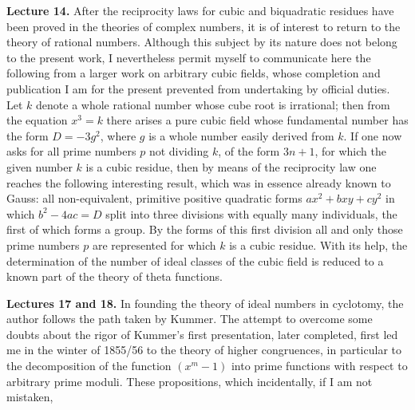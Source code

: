 \documentclass[11pt]{article}
\begin{document}
\textbf{Lecture 14.} After the reciprocity laws for cubic and biquadratic residues have been proved in the theories of complex numbers, it is of interest to return to the theory of rational numbers. Although this subject by its nature does not belong to the present work, I nevertheless permit myself to communicate here the following from a larger work on arbitrary cubic fields, whose completion and publication I am for the present prevented from undertaking by official duties. Let $k$ denote a whole rational number whose cube root is irrational; then from the equation $x^3=k$ there arises a pure cubic field whose fundamental number has the form $D=-3g^2$, where $g$ is a whole number easily derived from $k$. If one now asks for all prime numbers $p$ not dividing $k$, of the form $3n+1$, for which the given number $k$ is a cubic residue, then by means of the reciprocity law one reaches the following interesting result, which was in essence already known to Gauss: all non-equivalent, primitive positive quadratic forms $ax^2+bxy+cy^2$ in which $b^2-4ac=D$ split into three divisions with equally many individuals, the first of which forms a group. By the forms of this first division all and only those prime numbers $p$ are represented for which $k$ is a cubic residue. With its help, the determination of the number of ideal classes of the cubic field is reduced to a known part of the theory of theta functions.

\textbf{Lectures 17 and 18.} In founding the theory of ideal numbers in cyclotomy, the author follows the path taken by Kummer. The attempt to overcome some doubts about the rigor of Kummer's first presentation, later completed, first led me in the winter of 1855/56 to the theory of higher congruences, in particular to the decomposition of the function $(x^m-1)$ into prime functions with respect to arbitrary prime moduli. These propositions, which incidentally, if I am not mistaken,
\end{document}
